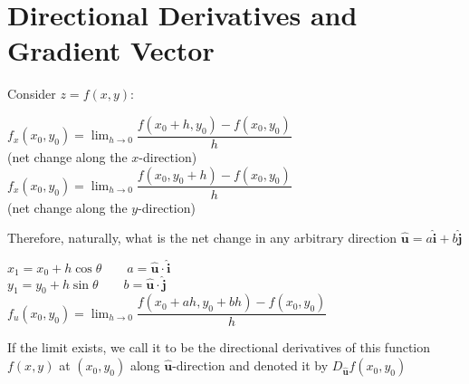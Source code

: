 \documentclass[UTF8,a4paper, 10pt, openany]{book}
\begin{document}
\section{Directional Derivatives and Gradient Vector}
Consider $z=f(x,y)$:
\begin{center}
$f_x(x_0,y_0)=\displaystyle\lim_{h\to 0}\dfrac{f(x_0+h,y_0)-f(x_0,y_0)}{h}$\\ (net change along the $x$-direction)\\
$f_x(x_0,y_0)=\displaystyle\lim_{h\to 0}\dfrac{f(x_0,y_0+h)-f(x_0,y_0)}{h}$\\ (net change along the $y$-direction)
\end{center}
Therefore, naturally, what is the net change in any arbitrary direction $\mathbf{\hat{u}}=a\mathbf{\hat{i}}+b\mathbf{\hat{j}}$
\begin{center}
$x_1=x_0+h\cos\theta \qquad a=\mathbf{\hat{u}}\cdot \mathbf{\hat{i}}$\\
$y_1=y_0+h\sin\theta \qquad b=\mathbf{\hat{u}}\cdot \mathbf{\hat{j}}$\\
$f_u(x_0,y_0)=\displaystyle\lim_{h\to 0}\dfrac{f(x_0+ah,y_0+bh)-f(x_0,y_0)}{h}$
\end{center}
If the limit exists, we call it to be the directional derivatives of this function $f(x,y)$ at $(x_0,y_0)$ along $\mathbf{\hat{u}}$-direction and denoted it by $D_{\mathbf{\hat{u}}}f(x_0,y_0)$
\end{document}

